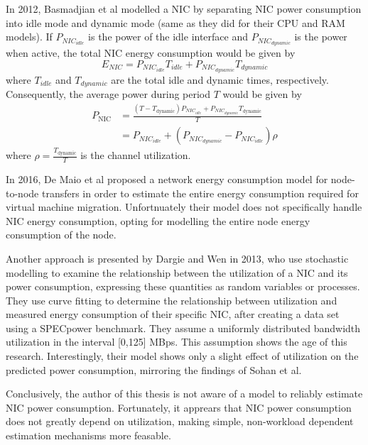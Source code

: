 In 2012, Basmadjian et al\parencite{basmadjianCloudComputingIts2012} modelled a NIC by separating NIC power consumption into idle mode and dynamic mode (same as they did for their CPU and RAM models). If $P_{NIC_{idle}}$ is the power of the idle interface and $P_{NIC_{dynamic}}$ is the power when active, the total NIC energy consumption would be given by
\begin{equation}
    E_{NIC} = P_{NIC_{idle}}T_{idle} + P_{NIC_{dynamic}}T_{dynamic}
\end{equation}
where $T_{idle}$ and $T_{dynamic}$ are the total idle and dynamic times, respectively. Consequently, the average power during period $T$ would be given by
\begin{align}
    P_{\text{NIC}} &= \frac{(T - T_{\text{dynamic}}) P_{NIC_{idle}} + P_{NIC_{dynamic}} T_{\text{dynamic}}}{T}\\
                   &= P_{NIC_{idle}} + (P_{NIC_{dynamic}} - P_{NIC_{idle}})\rho
\end{align}
where $\rho=\frac{T_{\text{dynamic}}}{T}$ is the channel utilization.

In 2016, De Maio et al\parencite{demaioModellingEnergyConsumption2016} proposed a network energy consumption model for node-to-node transfers in order to estimate the entire energy consumption required for virtual machine migration. Unfortnuately their model does not specifically handle NIC energy consumption, opting for modelling the entire node energy consumption of the node.

Another approach is presented by Dargie and Wen\parencite{dargieProbabilisticModelEstimating2013} in 2013, who use stochastic modelling to examine the relationship between the utilization of a NIC and its power consumption, expressing these quantities as random variables or processes. They use curve fitting to determine the relationship between utilization and measured energy consumption of their specific NIC, after creating a data set using a SPECpower benchmark. They assume a uniformly distributed bandwidth utilization in the interval [0,125] MBps. This assumption shows the age of this research. Interestingly, their model shows only a slight effect of utilization on the predicted power consumption, mirroring the findings of Sohan et al.

Conclusively, the author of this thesis is not aware of a model to reliably estimate NIC power consumption. Fortunately, it apprears that NIC power consumption does not greatly depend on utilization, making simple, non-workload dependent estimation mechanisms more feasable.

